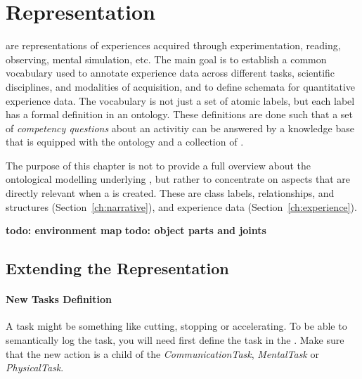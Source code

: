 \chapter{Representation}
\label{chap:represenation}

\neems are representations of experiences acquired through experimentation, reading, observing, mental simulation, etc.
The main goal is to establish a common vocabulary used to annotate experience data across different tasks, scientific disciplines, and modalities of acquisition, and to define schemata for quantitative experience data.
The vocabulary is not just a set of atomic labels, but each label has a formal definition in an ontology.
These definitions are done such that a set of \emph{competency questions} about an activitiy can be answered by a knowledge base that is equipped with the ontology and a collection of \neems.

The purpose of this chapter is not to provide a full overview about the ontological modelling underlying \neems, but rather to concentrate on aspects that are directly relevant when a \neem is created.
These are class labels, relationships, and structures (Section~\ref{ch:narrative}), and experience data (Section~\ref{ch:experience}).

\textbf{todo: environment map}
\textbf{todo: object parts and joints}





\section{Extending the Representation}
\label{sec:extension}
\subsubsection{New Tasks Definition}
\label{sec:extension,subsec:task}
A task might be something like cutting, stopping or accelerating.
To be able to semantically log the task, you will need first define the task in the \easeAct.
Make sure that the new action is a child of the \textit{CommunicationTask}, \textit{MentalTask} or \textit{PhysicalTask}.
